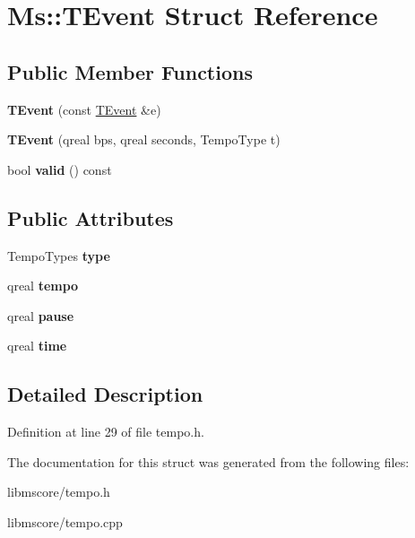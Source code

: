 \hypertarget{struct_ms_1_1_t_event}{}\section{Ms\+:\+:T\+Event Struct Reference}
\label{struct_ms_1_1_t_event}
\subsection*{Public Member Functions}
\begin{DoxyCompactItemize}
\item 
\mbox{\label{struct_ms_1_1_t_event_a5fa86b79f52b1c4471e44b346872841c}} 
{\bfseries T\+Event} (const \hyperlink{struct_ms_1_1_t_event}{T\+Event} \&e)
\item 
\mbox{\label{struct_ms_1_1_t_event_a62f9a4051a2c4e7f9c45953ee72e1f55}} 
{\bfseries T\+Event} (qreal bps, qreal seconds, Tempo\+Type t)
\item 
\mbox{\label{struct_ms_1_1_t_event_a373cc57997313a8df866747328485c51}} 
bool {\bfseries valid} () const
\end{DoxyCompactItemize}
\subsection*{Public Attributes}
\begin{DoxyCompactItemize}
\item 
\mbox{\label{struct_ms_1_1_t_event_a4a7fb65fc9f18836390c6760d44ed342}} 
Tempo\+Types {\bfseries type}
\item 
\mbox{\label{struct_ms_1_1_t_event_ae2b6126a2f8931c79b3e40eec090c054}} 
qreal {\bfseries tempo}
\item 
\mbox{\label{struct_ms_1_1_t_event_a039143917542d571929be4d46936670f}} 
qreal {\bfseries pause}
\item 
\mbox{\label{struct_ms_1_1_t_event_afd54608a2ba7a92f816291e4c8a876a2}} 
qreal {\bfseries time}
\end{DoxyCompactItemize}


\subsection{Detailed Description}


Definition at line 29 of file tempo.\+h.



The documentation for this struct was generated from the following files\+:\begin{DoxyCompactItemize}
\item 
libmscore/tempo.\+h\item 
libmscore/tempo.\+cpp\end{DoxyCompactItemize}
